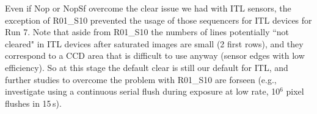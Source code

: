 %
%
%
%


Even if Nop or NopSf overcome the clear issue we had with ITL
sensors, the exception of R01\_S10 prevented
the usage of those sequencers for ITL devices for Run 7. Note that
aside from R01\_S10 the numbers of lines potentially
``not cleared" in ITL devices after saturated images are small (2 first rows), and they
correspond to a CCD area that is difficult to use anyway (sensor edges with low
efficiency). So at this stage the default clear is still our default
for ITL, and further studies to overcome the problem with
R01\_S10 are forseen (e.g., investigate using a continuous
serial flush during exposure at low rate, 10$^6$ pixel flushes in 15\,s).

